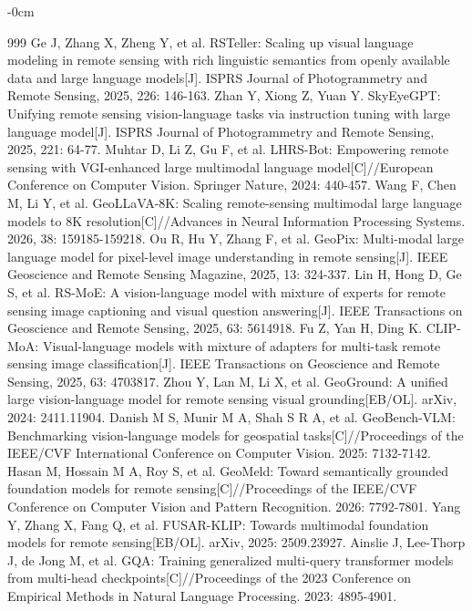 \documentclass[applsci,article,accept,moreauthors]{Definitions/mdpi}
\begin{document}
\begin{adjustwidth}{-\extralength}{0cm}
\begin{thebibliography}{999}
Ge J, Zhang X, Zheng Y, et al. RSTeller: Scaling up visual language modeling in remote sensing with rich linguistic semantics from openly available data and large language models[J]. ISPRS Journal of Photogrammetry and Remote Sensing, 2025, 226: 146-163.
Zhan Y, Xiong Z, Yuan Y. SkyEyeGPT: Unifying remote sensing vision-language tasks via instruction tuning with large language model[J]. ISPRS Journal of Photogrammetry and Remote Sensing, 2025, 221: 64-77.
Muhtar D, Li Z, Gu F, et al. LHRS-Bot: Empowering remote sensing with VGI-enhanced large multimodal language model[C]//European Conference on Computer Vision. Springer Nature, 2024: 440-457.
Wang F, Chen M, Li Y, et al. GeoLLaVA-8K: Scaling remote-sensing multimodal large language models to 8K resolution[C]//Advances in Neural Information Processing Systems. 2026, 38: 159185-159218.
Ou R, Hu Y, Zhang F, et al. GeoPix: Multi-modal large language model for pixel-level image understanding in remote sensing[J]. IEEE Geoscience and Remote Sensing Magazine, 2025, 13: 324-337.
Lin H, Hong D, Ge S, et al. RS-MoE: A vision-language model with mixture of experts for remote sensing image captioning and visual question answering[J]. IEEE Transactions on Geoscience and Remote Sensing, 2025, 63: 5614918.
Fu Z, Yan H, Ding K. CLIP-MoA: Visual-language models with mixture of adapters for multi-task remote sensing image classification[J]. IEEE Transactions on Geoscience and Remote Sensing, 2025, 63: 4703817.
Zhou Y, Lan M, Li X, et al. GeoGround: A unified large vision-language model for remote sensing visual grounding[EB/OL]. arXiv, 2024: 2411.11904.
Danish M S, Munir M A, Shah S R A, et al. GeoBench-VLM: Benchmarking vision-language models for geospatial tasks[C]//Proceedings of the IEEE/CVF International Conference on Computer Vision. 2025: 7132-7142.
Hasan M, Hossain M A, Roy S, et al. GeoMeld: Toward semantically grounded foundation models for remote sensing[C]//Proceedings of the IEEE/CVF Conference on Computer Vision and Pattern Recognition. 2026: 7792-7801.
Yang Y, Zhang X, Fang Q, et al. FUSAR-KLIP: Towards multimodal foundation models for remote sensing[EB/OL]. arXiv, 2025: 2509.23927.
Ainslie J, Lee-Thorp J, de Jong M, et al. GQA: Training generalized multi-query transformer models from multi-head checkpoints[C]//Proceedings of the 2023 Conference on Empirical Methods in Natural Language Processing. 2023: 4895-4901.

\end{thebibliography}
\end{adjustwidth}
\end{document}
